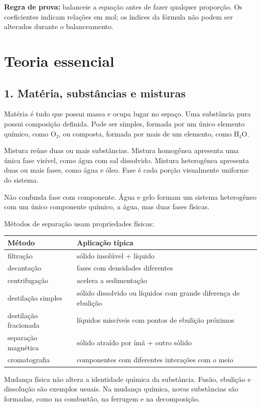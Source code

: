 \documentclass[11pt,a4paper]{article}
\begin{document}
\textbf{Regra de prova:} balanceie a equação antes de fazer qualquer proporção. Os coeficientes indicam relações em mol; os índices da fórmula não podem ser alterados durante o balanceamento.

\section*{Teoria essencial}

\subsection*{1. Matéria, substâncias e misturas}

Matéria é tudo que possui massa e ocupa lugar no espaço. Uma substância pura possui composição definida. Pode ser simples, formada por um único elemento químico, como O₂, ou composta, formada por mais de um elemento, como H₂O.

Mistura reúne duas ou mais substâncias. Mistura homogênea apresenta uma única fase visível, como água com sal dissolvido. Mistura heterogênea apresenta duas ou mais fases, como água e óleo. Fase é cada porção visualmente uniforme do sistema.

Não confunda fase com componente. Água e gelo formam um sistema heterogêneo com um único componente químico, a água, mas duas fases físicas.

Métodos de separação usam propriedades físicas:

\begin{tabularx}{\linewidth}{lX}
\toprule
 \textbf{Método} & \textbf{Aplicação típica} \\
\midrule
 filtração & sólido insolúvel + líquido \\
 decantação & fases com densidades diferentes \\
 centrifugação & acelera a sedimentação \\
 destilação simples & sólido dissolvido ou líquidos com grande diferença de ebulição \\
 destilação fracionada & líquidos miscíveis com pontos de ebulição próximos \\
 separação magnética & sólido atraído por ímã + outro sólido \\
 cromatografia & componentes com diferentes interações com o meio \\
\bottomrule
\end{tabularx}


Mudança física não altera a identidade química da substância. Fusão, ebulição e dissolução são exemplos usuais. Na mudança química, novas substâncias são formadas, como na combustão, na ferrugem e na decomposição.
\end{document}
